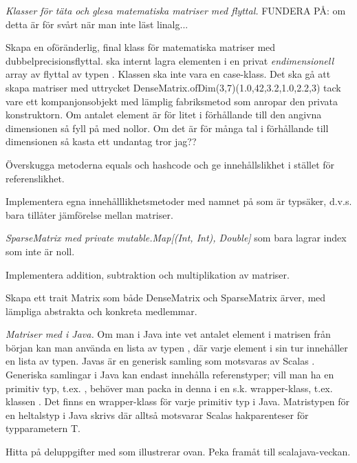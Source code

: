 \Task \TODO \emph{Klasser för täta och glesa matematiska matriser med flyttal.}  FUNDERA PÅ: om detta är för svårt när man inte läst linalg...

\Subtask Skapa en oföränderlig, final klass  för matematiska matriser med dubbelprecisionsflyttal.  ska internt lagra elementen i en privat \emph{endimensionell} array av flyttal av typen . Klassen ska inte vara en case-klass. Det ska gå att skapa matriser med uttrycket DenseMatrix.ofDim(3,7)(1.0,42,3.2,1.0,2.2,3) tack vare ett kompanjonsobjekt med lämplig fabriksmetod som anropar den privata konstruktorn.  Om antalet element är för litet i förhållande till den angivna dimensionen så fyll på med nollor. Om det är för många tal i förhållande till dimensionen så kasta ett undantag \TODO tror jag??

\Subtask Överskugga metoderna equals och hashcode och ge  innehållslikhet i stället för referenslikhet.

\Subtask Implementera egna innehålllikhetsmetoder med namnet \code{===} på  som är typsäker, d.v.s. bara tillåter jämförelse mellan matriser.

\Subtask \emph{SparseMatrix med private mutable.Map[(Int, Int), Double]} som bara lagrar index som inte är noll.

\Subtask Implementera addition, subtraktion och multiplikation av matriser.

\Subtask Skapa ett trait Matrix som både DenseMatrix och SparseMatrix ärver, med lämpliga abstrakta och konkreta medlemmar.

\Task \emph{Matriser med  i Java.} Om man i Java inte vet antalet element i matrisen från början kan man använda en lista av typen , där varje element i sin tur innehåller en lista av typen. Javas  är en generisk samling som motsvaras av Scalas . Generiska samlingar i Java kan endast innehålla referenstyper; vill man ha en primitiv typ, t.ex. , behöver man packa in denna i en s.k. wrapper-klass, t.ex.  klassen . Det finns en wrapper-klass för varje primitiv typ i Java. Matristypen för en heltalstyp i Java skrivs  där alltså  motsvarar Scalas hakparenteser \code{[T]} för typparametern T.


\Subtask \TODO Hitta på deluppgifter med  som illustrerar ovan. Peka framåt till scalajava-veckan.

    